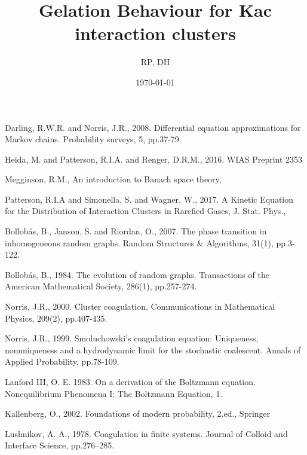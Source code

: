 \documentclass[11pt, notitlepage]{article}
\title{Gelation Behaviour for Kac interaction clusters}
\author{RP, DH}
\date{\today}
\begin{document}
\maketitle
















\begin{thebibliography}{}
 Darling, R.W.R. and Norris, J.R., 2008. Differential equation approximations for Markov chains. Probability surveys, 5, pp.37-79.

 Heida, M. and Patterson, R.I.A. and Renger, D.R,M., 2016. WIAS Preprint 2353

 Megginson, R.M., An introduction to Banach space theory,

 Patterson, R.I.A and Simonella, S. and Wagner, W., 2017. A Kinetic Equation for the Distribution of Interaction Clusters in Rarefied Gases, J. Stat. Phys., 

 Bollob\'as, B., Janson, S. and Riordan, O., 2007. The phase transition in inhomogeneous random graphs. Random Structures \& Algorithms, 31(1), pp.3-122.

 Bollob\'as, B., 1984. The evolution of random graphs. Transactions of the American Mathematical Society, 286(1), pp.257-274.

 Norris, J.R., 2000. Cluster coagulation. Communications in Mathematical Physics, 209(2), pp.407-435.

 Norris, J.R., 1999. Smoluchowski's coagulation equation: Uniqueness, nonuniqueness and a hydrodynamic limit for the stochastic coalescent. Annals of Applied Probability, pp.78-109.

 Lanford III, O. E. 1983. On a derivation of the Boltzmann equation. Nonequilibrium Phenomena I: The Boltzmann Equation, 1.


 Kallenberg, O., 2002. Foundations of modern probability, 2.ed., Springer

 Lushnikov, A. A., 1978. Coagulation in finite systems.  Journal of Colloid and Interface Science, pp.276--285.


\end{thebibliography}
\end{document}
